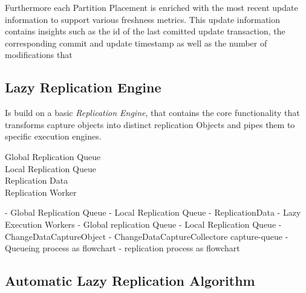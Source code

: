 Furthermore each Partition Placement is enriched with the most recent update information to support various freshness metrics.
This update information contains insights such as the id of the last comitted update transaction, the corresponding commit and update timestamp as well as the number of 
modifications that 


\subsection{Lazy Replication Engine}

Is build on a basic \emph{Replication Engine}, that contains the core functionality that transforms capture objects into distinct replication Objects and 
pipes them to specific execution engines.

\begin{description}
    \item[Global Replication Queue] 
    \item[Local Replication Queue]
    \item[Replication Data]
    \item[Replication Worker]
\end{description}

- Global Replication Queue
- Local Replication Queue
- ReplicationData
- Lazy Execution Workers
- Global replication Queue
- Local Replication Queue
-ChangeDataCaptureObject
- ChangeDataCaptureCollectore capture-queue 
- Queueing process as flowchart
- replication process as flowchart




\subsection{Automatic Lazy Replication Algorithm}
\label{sec:algo}


